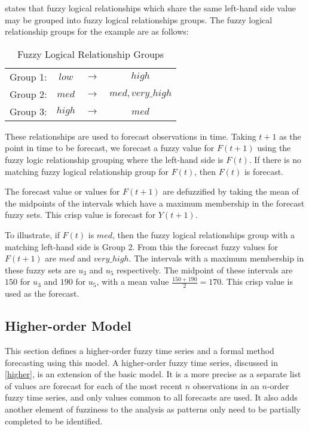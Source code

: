 \documentclass[12pt, oneside, a4paper]{article}
\theoremstyle{definition}
\begin{document}
 states that fuzzy logical relationships which share the same left-hand side value may be grouped into fuzzy logical relationships groups. The fuzzy logical relationship groups for the example are as follows:

\begin{table}[h]
	\center
	\begin{tabular}{ c c c c }
	\hline
  	Group 1: & $low$ & $\rightarrow$ & $high$ \\
  	Group 2: & $med$ & $\rightarrow$ & $med, very\_high$ \\
  	Group 3: & $high$ & $\rightarrow$ & $med$ \\
  	\hline
	\end{tabular}
	\caption{Fuzzy Logical Relationship Groups}
\end{table}

These relationships are used to forecast observations in time. Taking $t+1$ as the point in time to be forecast, we forecast a fuzzy value for $F(t+1)$ using the fuzzy logic relationship grouping where the left-hand side is $F(t)$. If there is no matching fuzzy logical relationship group for $F(t)$, then $F(t)$ is forecast.

The forecast value or values for $F(t+1)$ are defuzzified by taking the mean of the midpoints of the intervals which have a maximum membership in the forecast fuzzy sets. This crisp value is forecast for $Y(t+1)$.

To illustrate, if $F(t)$ is $med$, then the fuzzy logical relationships group with a matching left-hand side is Group 2. From this the forecast fuzzy values for $F(t+1)$ are $med$ and $very\_high$. The intervals with a maximum membership in these fuzzy sets are $u_3$ and $u_5$ respectively. The midpoint of these intervals are $150$ for $u_3$ and $190$ for $u_5$, with a mean value $\frac{150 + 190}{2}=170$. This crisp value is used as the forecast.

\subsection{Higher-order Model}
\label{higher-order}

This section defines a higher-order fuzzy time series and a formal method forecasting using this model. A higher-order fuzzy time series, discussed in \cref{higher}, is an extension of the basic model. It is a more precise as a separate list of values are forecast for each of the most recent $n$ observations in an $n$-order fuzzy time series, and only values common to all forecasts are used. It also adds another element of fuzziness to the analysis as patterns only need to be partially completed to be identified.
\end{document}
